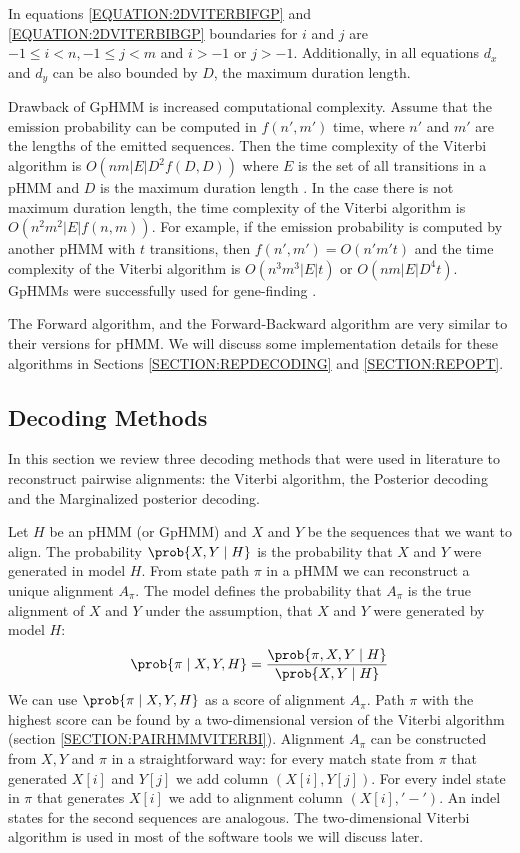 In equations \ref{EQUATION:2DVITERBIFGP} and \ref{EQUATION:2DVITERBIBGP}
boundaries for $i$ and $j$ are $ -1\leq i< n,-1\leq j< m$ and $i>-1$ or $j>-1$.
Additionally, in all equations $d_x$ and $d_y$ can be also bounded by $D$, the
maximum duration length.

Drawback of GpHMM is increased computational complexity. Assume that the
emission probability can be computed in $f(n',m')$ time, where $n'$ and $m'$
are the lengths of the emitted sequences. Then the time complexity of the
Viterbi algorithm is $O(nm|E|D^2f(D,D))$ where $E$ is the set of all
transitions in a pHMM and $D$ is the maximum duration length \cite{Meyer2002}.
In the case there is not maximum duration length, the time complexity of the
Viterbi algorithm is $O(n^2m^2|E|f(n,m))$. For example, if the emission
probability is computed by another pHMM with $t$ transitions, then
$f(n',m')=O(n'm't)$ and the time complexity of the Viterbi algorithm is
$O(n^3m^3|E|t)$ or $O(nm|E|D^4t)$.  GpHMMs were successfully used for
gene-finding \cite{SLAM2003,Alexanderson2004,Majoros2005,Meyer2002}. 

The Forward algorithm, and the Forward-Backward algorithm are very similar to
their versions for pHMM. We will discuss some implementation details for these
algorithms in Sections \ref{SECTION:REPDECODING} and
\ref{SECTION:REPOPT}.

\subsection{Decoding Methods}\label{SECTION:ALNDECODING}

In this section we review three decoding methods that were used in literature to
reconstruct pairwise alignments: the Viterbi algorithm, the Posterior
decoding and the Marginalized posterior decoding.

Let $H$ be an pHMM (or GpHMM) and $X$ and $Y$ be the sequences that we want to
align. The probability $\prob{X,Y\mid H}$ is the probability that $X$ and $Y$
were generated in model $H$.  From state path $\pi$ in a pHMM  we can
reconstruct a unique alignment $A_{\pi}$. The model defines the probability 
that
$A_{\pi}$ is the true alignment of $X$ and $Y$ under the assumption, that $X$ and $Y$ were
generated by model $H$:
  \[\prob{\pi\mid
X,Y,H}=\frac{\prob{\pi,X,Y\mid H}}{\prob{X,Y\mid H}}\]
  We can use $\prob{\pi\mid X,Y,H}$ as a score of 
alignment $A_{\pi}$. Path $\pi$ with the highest score can be found by a
two-dimensional version of the Viterbi
algorithm (section \ref{SECTION:PAIRHMMVITERBI}). Alignment $A_{\pi}$ can be
constructed from $X,Y$ and $\pi$ in a straightforward
way: for every match state from $\pi$ that generated $X[i]$ and $Y[j]$ we add
column $(X[i],Y[j])$. For every indel state in $\pi$ that generates $X[i]$ we
add to alignment column $(X[i],'-')$. An indel states for the second sequences are
analogous.  The two-dimensional Viterbi algorithm is used in  most of the
software tools we will discuss later.

